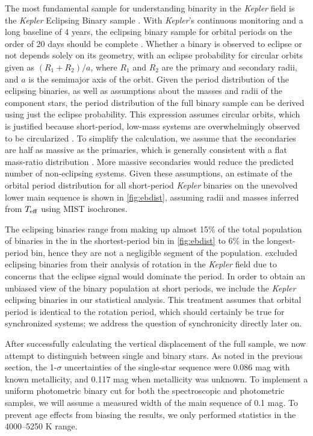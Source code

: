 \documentclass[manuscript]{aastex6}
\newcommand{\Kepler}{\mbox{\textit{Kepler}}}
\newcommand{\Teff}{\ensuremath{T_{\rm eff}}}
\begin{document}
The most fundamental sample for understanding binarity in the \Kepler{} field
is the \Kepler{} Eclipsing Binary sample \citep{Prsa11,Kirk16}. With
\Kepler{}'s continuous monitoring and a long baseline of 4 years, the eclipsing 
binary sample for orbital periods on the order of 20 days should be complete
\citep{Kirk16}.
Whether a binary is observed to eclipse or not depends solely on its geometry,
with an eclipse probability for circular orbits given as \((R_1 + R_2)/a\), where \(R_1\) and 
\(R_2\) are the primary and secondary radii, and \(a\) is the semimajor axis of
the orbit. Given the period distribution of the eclipsing binaries, as well as
assumptions about the masses and radii of the component stars, the period
distribution of the full binary sample can be derived using just the eclipse
probability. This expression assumes circular orbits, which is justified because
short-period, low-mass systems are overwhelmingly observed to be circularized
\citep{Raghavan10,VanEylen16}. To simplify the calculation, we
assume that the secondaries are half as massive as the primaries, which is
generally consistent with a flat mass-ratio distribution \citep{Raghavan10}. 
More massive secondaries would reduce the predicted number of non-eclipsing 
systems. Given these assumptions, an estimate of the orbital period distribution 
for all short-period \Kepler{} binaries on the unevolved lower main sequence is 
shown in \cref{fig:ebdist}, assuming radii and masses inferred from \Teff{} 
using MIST isochrones.

The eclipsing binaries range from making up almost 15\% of the total population 
of binaries in the in the shortest-period bin in \cref{fig:ebdist} to 6\% in the 
longest-period bin, hence they are not a negligible segment of the
population. \citet{McQuillan14} excluded eclipsing binaries from their analysis
of rotation in the \Kepler{} field due to concerns that the eclipse signal would
dominate the period. In order to obtain an unbiased view of the binary
population at short periods, we include the \Kepler{} eclipsing binaries in our
statistical analysis. This treatment assumes that orbital period is identical
to the rotation period, which should certainly be true for synchronized
systems; we address the question of synchronicity directly later on.

After successfully calculating the vertical displacement of the full sample, we
now attempt to distinguish between single and binary stars. As noted in the
previous section, the 1-\(\sigma\) uncertainties of the single-star sequence 
were 0.086 mag with known metallicity, and 0.117 mag when metallicity was unknown. 
To implement a uniform photometric binary cut for both the spectroscopic and
photometric samples, we will assume a measured width of the main sequence of 
0.1 mag. To prevent age effects 
from biasing the results, we only performed statistics in the 4000--5250 K 
range.
\end{document}
